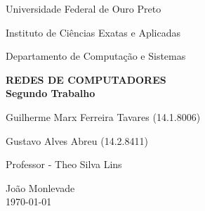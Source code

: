 \documentclass[brazil, a4paper,12pt]{article}
\begin{document}
\begin{titlepage}

  \vfill

  \begin{center}
    \begin{large}
      Universidade Federal de Ouro Preto
    \end{large}
  \end{center}

  \begin{center}
    \begin{large}
      Instituto de Ciências Exatas e Aplicadas
    \end{large}
  \end{center}

  \begin{center}
    \begin{large}
      Departamento de Computação e Sistemas
    \end{large}
  \end{center}

  \vfill

  \begin{center}
    \begin{Large}
      \textbf{REDES DE COMPUTADORES\\[0.4cm]
        Segundo Trabalho}
    \end{Large}
  \end{center}


  \vfill

  \begin{center}
    \begin{large}
      Guilherme Marx Ferreira Tavares (14.1.8006)
    \end{large}
  \end{center}
  
\begin{center}
    \begin{large}
      Gustavo Alves Abreu (14.2.8411)
    \end{large}
  \end{center}
  
  \begin{center}
    \begin{large}
      Professor - Theo Silva Lins
    \end{large}
  \end{center}

  \vfill

  \begin{center}
    \begin{large}
      João Monlevade \\
      \today \\
    \end{large}
  \end{center}

\clearpage
\tableofcontents
\end{titlepage}
\end{document}

